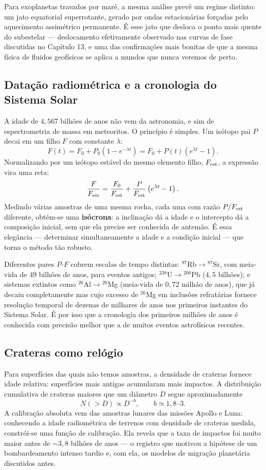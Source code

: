 \documentclass[11pt,a4paper]{article}
\begin{document}
Para exoplanetas travados por maré, a mesma análise prevê um regime distinto: um jato equatorial superrotante, gerado por ondas estacionárias forçadas pelo aquecimento assimétrico permanente. É esse jato que desloca o ponto mais quente do subestelar --- deslocamento efetivamente observado nas curvas de fase discutidas no Capítulo 13, e uma das confirmações mais bonitas de que a mesma física de fluidos geofísicos se aplica a mundos que nunca veremos de perto.

\subsection*{Datação radiométrica e a cronologia do Sistema Solar}

A idade de $4{,}567$ bilhões de anos não vem da astronomia, e sim de espectrometria de massa em meteoritos. O princípio é simples. Um isótopo pai $P$ decai em um filho $F$ com constante $\lambda$:
\[
F(t)=F_0+P_0\left(1-e^{-\lambda t}\right)=F_0+P(t)\left(e^{\lambda t}-1\right).
\]
Normalizando por um isótopo estável do mesmo elemento filho, $F_{\rm est}$, a expressão vira uma reta:
\[
\frac{F}{F_{\rm est}}=\frac{F_0}{F_{\rm est}}+\frac{P}{F_{\rm est}}\left(e^{\lambda t}-1\right).
\]
Medindo várias amostras de uma mesma rocha, cada uma com razão $P/F_{\rm est}$ diferente, obtém-se uma \textbf{isócrona}: a inclinação dá a idade e o intercepto dá a composição inicial, sem que ela precise ser conhecida de antemão. É essa elegância --- determinar simultaneamente a idade e a condição inicial --- que torna o método tão robusto.

Diferentes pares $P$-$F$ cobrem escalas de tempo distintas: $^{87}$Rb$\to{}^{87}$Sr, com meia-vida de $49$ bilhões de anos, para eventos antigos; $^{238}$U$\to{}^{206}$Pb ($4{,}5$ bilhões); e sistemas extintos como $^{26}$Al$\to{}^{26}$Mg (meia-vida de $0{,}72$ milhão de anos), que já decaiu completamente mas cujo excesso de $^{26}$Mg em inclusões refratárias fornece resolução temporal de dezenas de milhares de anos nos primeiros instantes do Sistema Solar. É por isso que a cronologia dos primeiros milhões de anos é conhecida com precisão melhor que a de muitos eventos astrofísicos recentes.

\subsection*{Crateras como relógio}

Para superfícies das quais não temos amostras, a densidade de crateras fornece idade relativa: superfícies mais antigas acumularam mais impactos. A distribuição cumulativa de crateras maiores que um diâmetro $D$ segue aproximadamente
\[
N(>D)\propto D^{-b},
\qquad
b\simeq1{,}8\text{--}3.
\]
A calibração absoluta vem das amostras lunares das missões Apollo e Luna: conhecendo a idade radiométrica de terrenos com densidade de crateras medida, constrói-se uma função de calibração. Ela revela que a taxa de impactos foi muito maior antes de $\sim3{,}8$ bilhões de anos --- o registro que motivou a hipótese de um bombardeamento intenso tardio e, com ela, os modelos de migração planetária discutidos antes.
\end{document}
